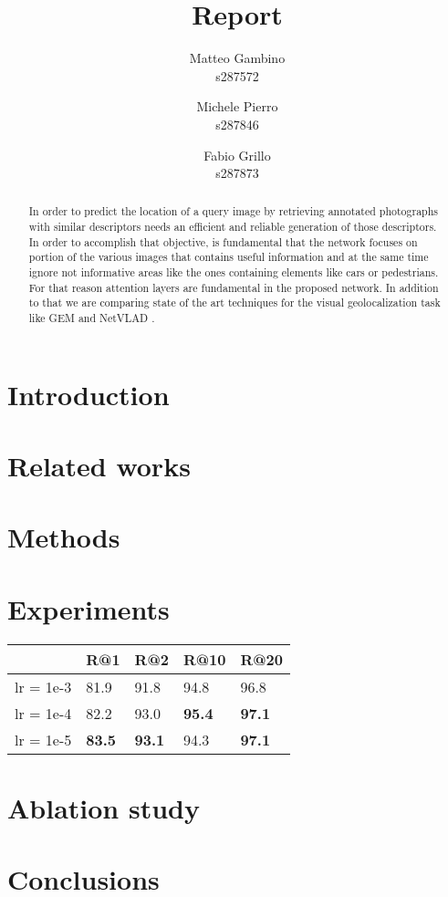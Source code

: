 \documentclass[10pt,twocolumn,letterpaper]{article}
\begin{document}
\title{Report}

\author{Matteo Gambino\\
s287572
\and
Michele Pierro\\
s287846
\and
Fabio Grillo\\
s287873
}
\maketitle

\begin{abstract}
   In order to predict the location of a query image by retrieving annotated photographs with 
   similar descriptors needs an efficient and reliable generation of those descriptors. 
   In order to accomplish that objective, is fundamental that the network focuses on portion
   of the various images that contains useful information and at the same time ignore not 
   informative areas like the ones containing elements like cars or pedestrians. For that 
   reason attention layers are fundamental in the proposed network. In addition to that we 
   are comparing state of the art techniques for the visual geolocalization task like GEM \cite{GEM}
   and NetVLAD \cite{NETVLAD}.
\end{abstract}

\section{Introduction}

\section{Related works}
\section{Methods}
\section{Experiments}
 \begin{tabular}{|l|l|l|l|l|}
\hline
          & R@1       &  R@2    & R@10 & R@20      \\
\hline
lr = 1e-3            & 81.9    & 91.8 & 94.8 & 96.8          \\
\hline
lr = 1e-4            & 82.2    & 93.0 & \textbf{95.4} & \textbf{97.1}          \\
\hline
lr = 1e-5            & \textbf{83.5}    & \textbf{93.1} & 94.3 & \textbf{97.1}          \\
\hline
\end{tabular}
\section{Ablation study}
\section{Conclusions}

{\small


}
\end{document}

